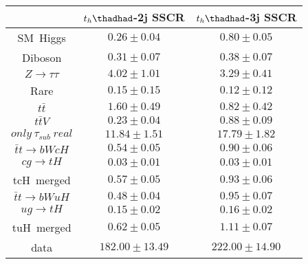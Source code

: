 \centering
\begin{tabular}{ccc} \toprule\toprule
& $t_{h}\thadhad$-2j SSCR  & $t_{h}\thadhad$-3j SSCR\\ \midrule
SM~Higgs                & $0.26\pm0.04$                        & $0.80\pm0.05$\\
Diboson                 & $0.31\pm0.07$                        & $0.38\pm0.07$\\
$Z\to\tau\tau$          & $4.02\pm1.01$                        & $3.29\pm0.41$\\
Rare                    & $0.15\pm0.15$                        & $0.12\pm0.12$\\
$t\bar{t}$              & $1.60\pm0.49$                        & $0.82\pm0.42$\\
$t\bar{t}V$             & $0.23\pm0.04$                        & $0.88\pm0.09$\\
$only~\tau_{sub}~real$  & $11.84\pm1.51$                       & $17.79\pm1.82$\\\midrule
$\bar{t}t\to bWcH$      & $0.54\pm0.05$                        & $0.90\pm0.06$\\
$cg\to tH$              & $0.03\pm0.01$                        & $0.03\pm0.01$\\
tcH~merged              & $0.57\pm0.05$                        & $0.93\pm0.06$\\
$\bar{t}t\to bWuH$      & $0.48\pm0.04$                        & $0.95\pm0.07$\\
$ug\to tH$              & $0.15\pm0.02$                        & $0.16\pm0.02$\\
tuH~merged              & $0.62\pm0.05$                        & $1.11\pm0.07$\\\midrule
data                    & $182.00\pm13.49$                     & $222.00\pm14.90$\\
\bottomrule\bottomrule
\end{tabular}
